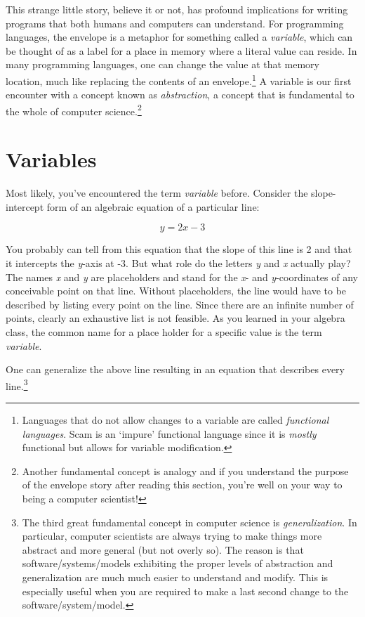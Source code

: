 This strange little story,
believe it or not,
has profound implications
for writing programs that both humans and computers can understand.
For
programming languages,
the envelope is a metaphor for something called
a {\it variable},
which can be thought of as a label for a place in memory
where a literal value can reside.
In many programming languages,
one can change the value at that memory location,
much like replacing
the contents of an envelope.\footnote{
Languages that do not allow changes to a variable are called
{\it functional languages}.
Scam is an `impure' functional language
since it is {\it mostly} functional but allows for variable modification.
}
A variable is our first encounter with a
concept known as {\it abstraction},
a concept that is fundamental to the whole
of computer science.\footnote{
Another fundamental concept is analogy and if you understand the
purpose of the envelope story after reading this section,
you're well
on your way to being a computer scientist!
}

\section{Variables}

Most likely,
you've encountered the term {\it variable} before.
Consider the
slope-intercept form of an algebraic equation of a particular line:

    \[  y = 2x - 3 \]

You probably can tell from this equation that the slope of this line
is 2 and that it intercepts the {\it y}-axis at -3.
But what role do
the letters {\it y} and {\it x} actually play?  The names {\it x} and {\it y}
are placeholders and stand for the {\it x}- and {\it y}-coordinates of any
conceivable point on that line.
Without placeholders,
the line would
have to be described by listing every point on the line.
Since there
are an infinite number of points,
clearly an exhaustive list is not
feasible.
As you learned in your algebra class,
the common name for a
place holder for a specific value is the term {\it variable}.

One can generalize the above line resulting in an equation that describes
every line.\footnote{
The third great fundamental concept in computer science
is {\it generalization}.
In particular,
computer scientists are always trying to make things
more abstract and more general (but not overly so).
The reason is that
software/systems/models exhibiting the proper levels of abstraction and
generalization are much much easier to understand and modify.
This is
especially useful when you are required to make a last second
change to the software/system/model.
}

